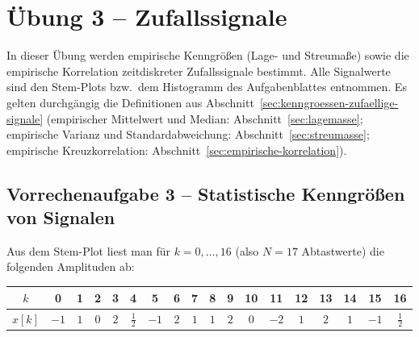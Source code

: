 \section{Übung 3 – Zufallssignale}

In dieser Übung werden empirische Kenngrößen (Lage- und Streumaße) sowie die
empirische Korrelation zeitdiskreter Zufallssignale bestimmt. Alle Signalwerte
sind den Stem-Plots bzw.\ dem Histogramm des Aufgabenblattes entnommen. Es
gelten durchgängig die Definitionen aus Abschnitt~\ref{sec:kenngroessen-zufaellige-signale}
(empirischer Mittelwert und Median: Abschnitt~\ref{sec:lagemasse}; empirische
Varianz und Standardabweichung: Abschnitt~\ref{sec:streumasse}; empirische
Kreuzkorrelation: Abschnitt~\ref{sec:empirische-korrelation}).

\subsection*{Vorrechenaufgabe 3 – Statistische Kenngrößen von Signalen}

Aus dem Stem-Plot liest man für $k = 0, \ldots, 16$ (also $N = 17$ Abtastwerte)
die folgenden Amplituden ab:

\begin{center}
\renewcommand{\arraystretch}{1.2}
\begin{tabular}{c|ccccccccccccccccc}
$k$    & 0 & 1 & 2 & 3 & 4 & 5 & 6 & 7 & 8 & 9 & 10 & 11 & 12 & 13 & 14 & 15 & 16 \\
\hline
$x[k]$ & $-1$ & $1$ & $0$ & $2$ & $\tfrac12$ & $-1$ & $2$ & $1$ & $1$ & $2$
       & $0$ & $-2$ & $1$ & $2$ & $1$ & $-1$ & $\tfrac12$ \\
\end{tabular}
\end{center}

\begin{center}
\end{center}

